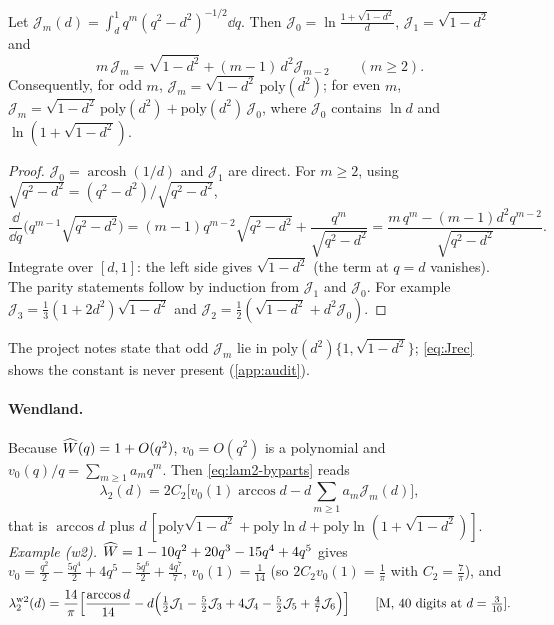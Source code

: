 \begin{lemma}\label{lem:J}
Let $\mathcal J_m(d)=\int_d^1 q^m(q^2-d^2)^{-1/2}\dd q$. Then
$\mathcal J_0=\ln\frac{1+\sqrt{1-d^2}}{d}$, $\mathcal J_1=\sqrt{1-d^2}$ and
\begin{equation}\label{eq:Jrec}
 m\,\mathcal J_m=\sqrt{1-d^2}+(m-1)\,d^2\mathcal J_{m-2}\qquad(m\ge2).
\end{equation}
Consequently, for odd $m$, $\mathcal J_m=\sqrt{1-d^2}\,\mathrm{poly}(d^2)$; for even $m$,
$\mathcal J_m=\sqrt{1-d^2}\,\mathrm{poly}(d^2)+\mathrm{poly}(d^2)\,\mathcal J_0$, where $\mathcal J_0$ contains
$\ln d$ and $\ln(1+\sqrt{1-d^2})$. 
\end{lemma}
\begin{proof}
$\mathcal J_0=\operatorname{arcosh}(1/d)$ and $\mathcal J_1$ are direct. For $m\ge2$, using
$\sqrt{q^2-d^2}=(q^2-d^2)/\sqrt{q^2-d^2}$,
\[
 \frac{\dd}{\dd q}\Big(q^{m-1}\sqrt{q^2-d^2}\Big)
 =(m-1)q^{m-2}\sqrt{q^2-d^2}+\frac{q^m}{\sqrt{q^2-d^2}}
 =\frac{m\,q^m-(m-1)d^2q^{m-2}}{\sqrt{q^2-d^2}} .
\]
Integrate over $[d,1]$: the left side gives $\sqrt{1-d^2}$ (the term at $q=d$ vanishes). The parity statements follow
by induction from $\mathcal J_1$ and $\mathcal J_0$. For example $\mathcal J_3=\frac13(1+2d^2)\sqrt{1-d^2}$ and
$\mathcal J_2=\frac12(\sqrt{1-d^2}+d^2\mathcal J_0)$.
\end{proof}
\begin{remark}
The project notes state that odd $\mathcal J_m$ lie in $\mathrm{poly}(d^2)\{1,\sqrt{1-d^2}\}$; \cref{eq:Jrec}
shows the constant is never present (\cref{app:audit}).
\end{remark}

\paragraph{Wendland.} Because $\widehat W(q)=1+O(q^2)$, $v_0=O(q^2)$ is a polynomial and $v_0(q)/q=\sum_{m\ge1}a_mq^m$. Then
\eqref{eq:lam2-byparts} reads
\begin{equation}\label{eq:lam2-wend}
 \lambda_2(d)=2C_2\Big[v_0(1)\arccos d-d\sum_{m\ge1}a_m\mathcal J_m(d)\Big],
\end{equation}
that is $\arccos d$ plus $d\,[\mathrm{poly}\sqrt{1-d^2}+\mathrm{poly}\ln d+\mathrm{poly}\ln(1+\sqrt{1-d^2})]$.
\emph{Example (w2).} $\widehat W=1-10q^2+20q^3-15q^4+4q^5$ gives
$v_0=\frac{q^2}2-\frac{5q^4}2+4q^5-\frac{5q^6}2+\frac{4q^7}7$, $v_0(1)=\frac1{14}$ (so $2C_2v_0(1)=\frac1\pi$ with $C_2=\frac7\pi$), and
\[
 \lambda_2^{\rm w2}(d)=\frac{14}\pi\Big[\frac{\arccos d}{14}-d\Big(\tfrac12\mathcal J_1-\tfrac52\mathcal J_3+4\mathcal J_4-\tfrac52\mathcal J_5+\tfrac47\mathcal J_6\Big)\Big]
 \qquad\text{[M, 40 digits at }d=\tfrac3{10}].
\]
